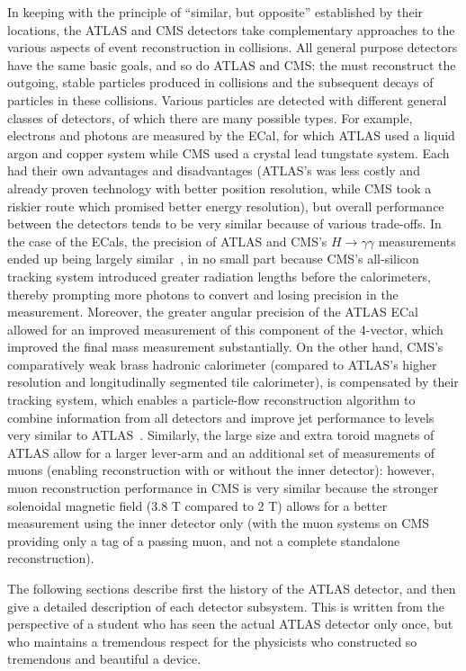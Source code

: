 In keeping with the principle of ``similar, but opposite'' established by their locations, the ATLAS and CMS detectors take complementary approaches to the various aspects of event reconstruction in collisions. All general purpose detectors have the same basic goals, and so do ATLAS and CMS: the must reconstruct the outgoing, stable particles produced in collisions and the subsequent decays of particles in these collisions. Various particles are detected with different general classes of detectors, of which there are many possible types. For example, electrons and photons are measured by the ECal, for which ATLAS used a liquid argon and copper system while CMS used a crystal lead tungstate system. Each had their own advantages and disadvantages (ATLAS's was less costly and already proven technology with better position resolution, while CMS took a riskier route which promised better energy resolution), but overall performance between the detectors tends to be very similar because of various trade-offs. In the case of the ECals, the precision of ATLAS and CMS's $H\rightarrow \gamma \gamma$ measurements ended up being largely similar~\cite{CombinedHiggs}, in no small part because CMS's all-silicon tracking system introduced greater radiation lengths before the calorimeters, thereby prompting more photons to convert and losing precision in the measurement. Moreover, the greater angular precision of the ATLAS ECal allowed for an improved measurement of this component of the 4-vector, which improved the final mass measurement substantially. On the other hand, CMS's comparatively weak brass hadronic calorimeter (compared to ATLAS's higher resolution and longitudinally segmented tile calorimeter), is compensated by their tracking system, which enables a particle-flow reconstruction algorithm to combine information from all detectors and improve jet performance to levels very similar to ATLAS~\cite{CMSPFlow}. Similarly, the large size and extra toroid magnets of ATLAS allow for a larger lever-arm and an additional set of measurements of muons (enabling reconstruction with or without the inner detector): however, muon reconstruction performance in CMS is very similar because the stronger solenoidal magnetic field (3.8 T compared to 2 T) allows for a better measurement using the inner detector only (with the muon systems on CMS providing only a tag of a passing muon, and not a complete standalone reconstruction). 


The following sections describe first the history of the ATLAS detector, and then give a detailed description of each detector subsystem. This is written from the perspective of a student who has seen the actual ATLAS detector only once, but who maintains a tremendous respect for the physicists who constructed so tremendous and beautiful a device.

